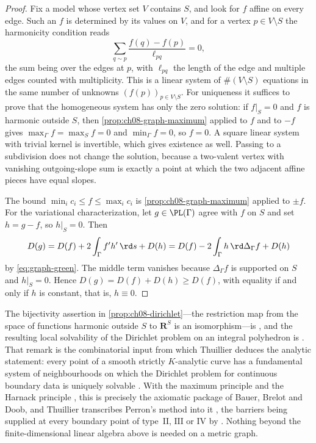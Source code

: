 \begin{proof}
Fix a model whose vertex set $V$ contains $S$, and look for $f$ affine on
every edge.  Such an $f$ is determined by its values on $V$, and for a vertex
$p\in V\setminus S$ the harmonicity condition reads
\begin{equation}
\label{eq:ch08-discrete-harmonic}
 \sum_{q\sim p}\frac{f(q)-f(p)}{\ell_{pq}}=0 ,
\end{equation}
the sum being over the edges at $p$, with $\ell_{pq}$ the length of the edge
and multiple edges counted with multiplicity.  This is a linear system of
$\#(V\setminus S)$ equations in the same number of unknowns
$(f(p))_{p\in V\setminus S}$.  For uniqueness it suffices to prove that the
homogeneous system has only the zero solution: if $f|_S=0$ and $f$ is
harmonic outside $S$, then \cref{prop:ch08-graph-maximum} applied to $f$ and
to $-f$ gives $\max_\Gamma f=\max_Sf=0$ and $\min_\Gamma f=0$, so $f=0$.  A
square linear system with trivial kernel is invertible, which gives existence
as well.  Passing to a subdivision does not change the solution, because a
two-valent vertex with vanishing outgoing-slope sum is exactly a point at
which the two adjacent affine pieces have equal slopes.

The bound $\min_ic_i\leq f\leq\max_ic_i$ is
\cref{prop:ch08-graph-maximum} applied to $\pm f$.  For the variational
characterization, let $g\in\PL(\Gamma)$ agree with $f$ on $S$ and set
$h=g-f$, so $h|_S=0$.  Then
\[
 D(g)=D(f)+2\int_\Gamma f'h'\,\rd s+D(h)
     =D(f)-2\int_\Gamma h\,\rd\Delta_\Gamma f+D(h)
\]
by \eqref{eq:graph-green}.  The middle term vanishes because
$\Delta_\Gamma f$ is supported on $S$ and $h|_S=0$.  Hence
$D(g)=D(f)+D(h)\geq D(f)$, with equality if and only if $h$ is constant,
that is, $h\equiv0$.
\end{proof}

The bijectivity assertion in \cref{prop:ch08-dirichlet}---the restriction map
from the space of functions harmonic outside $S$ to $\mathbf R^S$ is an
isomorphism---is \cite[Prop.~1.2.15]{Thu05}, and the resulting local
solvability of the Dirichlet problem on an integral polyhedron is
\cite[Rem.~1.2.16]{Thu05}.  That remark is the combinatorial input from which
Thuillier deduces the analytic statement: every point of a smooth strictly
$K$-analytic curve has a fundamental system of neighbourhoods on which the
Dirichlet problem for continuous boundary data is uniquely solvable
\cite[\S3.1.1 and Cor.~3.1.21]{Thu05}.  With the maximum principle
\cite[Prop.~3.1.1]{Thu05} and the Harnack principle
\cite[Prop.~3.1.2]{Thu05}, this is precisely the axiomatic package of Bauer,
Brelot and Doob, and Thuillier transcribes Perron's method into it
\cite[\S3.1.3]{Thu05}, the barriers being supplied at every boundary point of
type~$\mathrm{II}$, $\mathrm{III}$ or $\mathrm{IV}$ by
\cite[Prop.~3.1.20]{Thu05}.  Nothing beyond the finite-dimensional linear
algebra above is needed on a metric graph.

